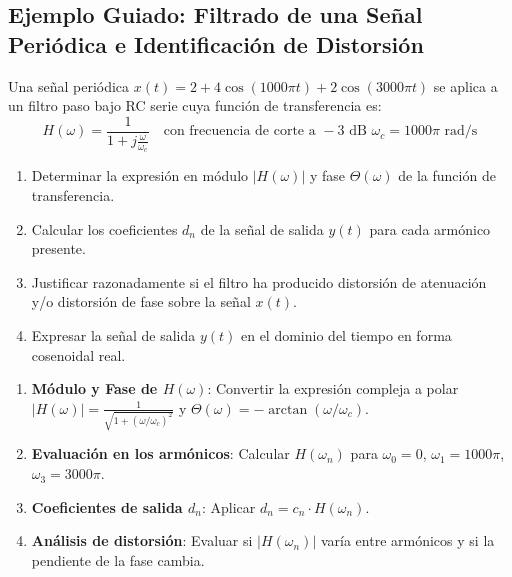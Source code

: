 \newpage

\subsection{Ejemplo Guiado: Filtrado de una Señal Periódica e Identificación de Distorsión}

\begin{problema}
Una señal periódica $x(t) = 2 + 4\cos(1000\pi t) + 2\cos(3000\pi t)$ se aplica a un filtro paso bajo RC serie cuya función de transferencia es:
\[
H(\omega) = \frac{1}{1 + j \frac{\omega}{\omega_c}} \quad \text{con frecuencia de corte a }-3\text{ dB } \omega_c = 1000\pi\text{ rad/s}
\]

\begin{enumerate}[label=\alph*)]
    \item Determinar la expresión en módulo $|H(\omega)|$ y fase $\Theta(\omega)$ de la función de transferencia.
    \item Calcular los coeficientes $d_n$ de la señal de salida $y(t)$ para cada armónico presente.
    \item Justificar razonadamente si el filtro ha producido distorsión de atenuación y/o distorsión de fase sobre la señal $x(t)$.
    \item Expresar la señal de salida $y(t)$ en el dominio del tiempo en forma cosenoidal real.
\end{enumerate}
\end{problema}

\begin{mecanizado}
\begin{enumerate}
    \item \textbf{Módulo y Fase de $H(\omega)$}: Convertir la expresión compleja a polar $|H(\omega)| = \frac{1}{\sqrt{1 + (\omega/\omega_c)^2}}$ y $\Theta(\omega) = -\arctan(\omega/\omega_c)$.
    \item \textbf{Evaluación en los armónicos}: Calcular $H(\omega_n)$ para $\omega_0 = 0$, $\omega_1 = 1000\pi$, $\omega_3 = 3000\pi$.
    \item \textbf{Coeficientes de salida $d_n$}: Aplicar $d_n = c_n \cdot H(\omega_n)$.
    \item \textbf{Análisis de distorsión}: Evaluar si $|H(\omega_n)|$ varía entre armónicos y si la pendiente de la fase cambia.
\end{enumerate}
\end{mecanizado}

